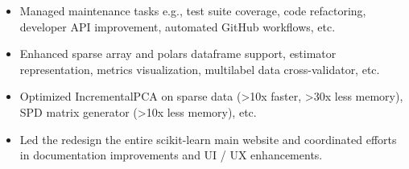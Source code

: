 


\begin{itemize}[nosep]
  \item Managed maintenance tasks e.g., test suite coverage, code refactoring, developer API improvement, automated GitHub workflows, etc.
  \item Enhanced sparse array and polars dataframe support, estimator representation, metrics visualization, multilabel data cross-validator, etc.
  \item Optimized IncrementalPCA on sparse data (>10x faster, >30x less memory), SPD matrix generator (>10x less memory), etc.
  \item Led the redesign the entire scikit-learn main website and coordinated efforts in documentation improvements and UI / UX enhancements.
\end{itemize}
